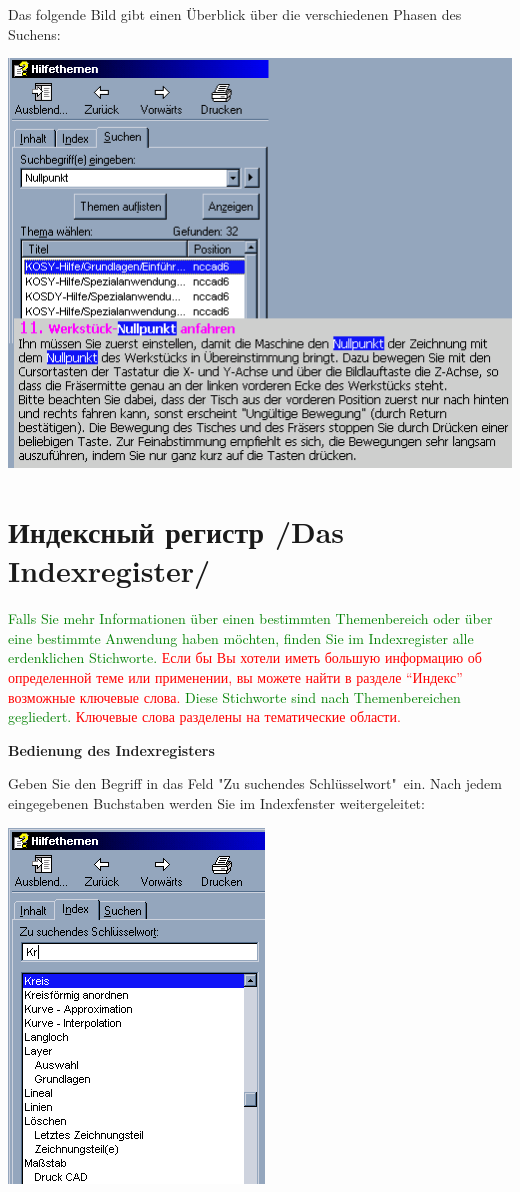 \documentclass[12pt,a4paper]{book}
\newcommand{\DE}[1]{\textcolor{green}{#1}}
\newcommand{\RU}[1]{\textcolor{red}{#1}}
\newcommand{\TRchapter}[2]{\chapter{#2 /#1/}}
\begin{document}
\bigskip

Das folgende Bild gibt einen Überblick über die verschiedenen Phasen des Suchens:

\includegraphics{pic/Suche1.png}

\TRchapter{Das Indexregister}{Индексный регистр}

\DE{Falls Sie mehr Informationen über einen bestimmten Themenbereich oder über
eine bestimmte Anwendung haben möchten, finden Sie im Indexregister alle
erdenklichen Stichworte.}
\RU{Если бы Вы хотели иметь большую информацию об определенной теме или
применении, вы можете найти в разделе ``Индекс'' возможные ключевые слова.}
\DE{Diese Stichworte sind nach Themenbereichen
gegliedert.}
\RU{Ключевые слова разделены на тематические области.}

\bigskip

\textbf{Bedienung des Indexregisters}

\bigskip

Geben Sie den Begriff in das Feld "Zu suchendes Schlüsselwort"\ ein. 
Nach jedem
eingegebenen Buchstaben werden Sie im Indexfenster weitergeleitet:

\includegraphics{pic/Suche2.png}
\end{document}
